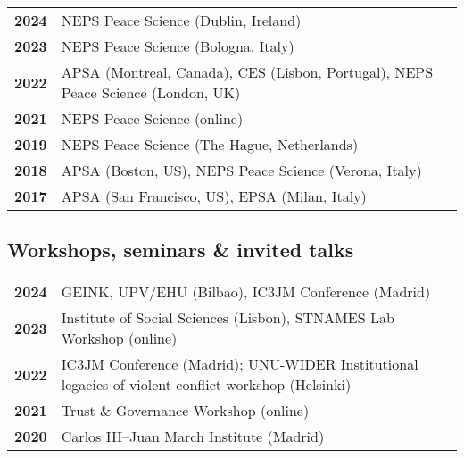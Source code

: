 \documentclass[a4paper, 12pt]{article}
\begin{document}
\begin{tabular}{lp{15cm}}
\textbf{2024} & NEPS Peace Science (Dublin, Ireland) \\
\textbf{2023} & NEPS Peace Science (Bologna, Italy) \\
\textbf{2022} & APSA  (Montreal, Canada), CES (Lisbon, Portugal), NEPS Peace Science (London, UK) \\
\textbf{2021} & NEPS Peace Science (online) \\
\textbf{2019} & NEPS Peace Science (The Hague, Netherlands) \\
\textbf{2018} & APSA (Boston, US), NEPS Peace Science (Verona, Italy) \\
\textbf{2017} & APSA (San Francisco, US), EPSA (Milan, Italy) \\
\end{tabular}



\subsection*{Workshops, seminars \& invited talks}


\begin{tabular}{lp{15cm}}
\textbf{2024} & GEINK, UPV/EHU (Bilbao), IC3JM Conference (Madrid) \\
\textbf{2023} & Institute of Social Sciences (Lisbon), STNAMES Lab Workshop (online) \\
\textbf{2022} & IC3JM Conference (Madrid); UNU-WIDER Institutional legacies of violent conflict workshop (Helsinki) \\
\textbf{2021} & Trust \& Governance Workshop (online) \\
\textbf{2020} & Carlos III--Juan March Institute (Madrid) \\
\end{tabular}

\end{document}
